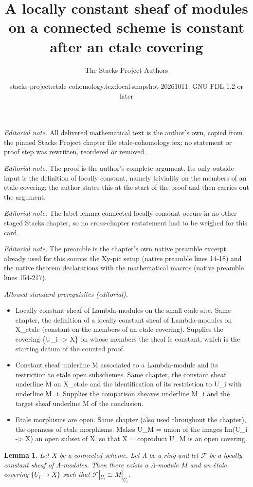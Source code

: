 \documentclass[10pt,a4paper]{amsart}
\title{A locally constant sheaf of modules on a connected scheme is constant after an etale covering}
\author{The Stacks Project Authors}
\date{stacks-project:etale-cohomology.tex:local-snapshot-20261011; GNU FDL 1.2 or later}
\theoremstyle{plain}
\newtheorem{lemma}[subsection]{Lemma}
\theoremstyle{definition}
\theoremstyle{remark}
\numberwithin{equation}{subsection}
\begin{document}
\maketitle
\noindent\textit{Editorial note.} All delivered mathematical text is the author's own, copied from the pinned Stacks Project chapter file etale-cohomology.tex; no statement or proof step was rewritten, reordered or removed.\par\medskip
\noindent\textit{Editorial note.} The proof is the author's complete argument. Its only outside input is the definition of locally constant, namely triviality on the members of an etale covering; the author states this at the start of the proof and then carries out the argument.\par\medskip
\noindent\textit{Editorial note.} The label lemma-connected-locally-constant occurs in no other staged Stacks chapter, so no cross-chapter restatement had to be weighed for this card.\par\medskip
\noindent\textit{Editorial note.} The preamble is the chapter's own native preamble excerpt already used for this source: the Xy-pic setup (native preamble lines 14-18) and the native theorem declarations with the mathematical macros (native preamble lines 154-217).\par\medskip
\noindent\textit{Allowed standard prerequisites (editorial).}\begin{itemize}
\item Locally constant sheaf of Lambda-modules on the small etale site. Same chapter, the definition of a locally constant sheaf of Lambda-modules on X\_etale (constant on the members of an etale covering). Supplies the covering \{U\_i -> X\} on whose members the sheaf is constant, which is the starting datum of the counted proof.
\item Constant sheaf underline M associated to a Lambda-module and its restriction to etale open subschemes. Same chapter, the constant sheaf underline M on X\_etale and the identification of its restriction to U\_i with underline M\_i. Supplies the comparison sheaves underline M\_i and the target sheaf underline M of the conclusion.
\item Etale morphisms are open. Same chapter (also used throughout the chapter), the openness of etale morphisms. Makes U\_M = union of the images Im(U\_i -> X) an open subset of X, so that X = coproduct U\_M is an open covering.
\end{itemize}\medskip
\begin{lemma}
\label{lemma-connected-locally-constant}
Let $X$ be a connected scheme. Let $\Lambda$ be a ring and let
$\mathcal{F}$ be a locally constant sheaf of $\Lambda$-modules.
Then there exists a $\Lambda$-module $M$ and an \'etale covering
$\{U_i \to X\}$ such that $\mathcal{F}|_{U_i} \cong \underline{M}|_{U_i}$.
\end{lemma}
\end{document}
